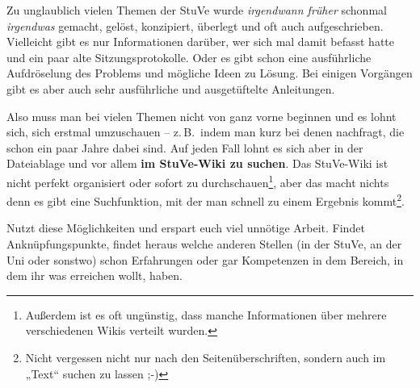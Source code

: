 


%
%
%


\null
\clearpage
\null
\vfill
Zu unglaublich vielen Themen der StuVe wurde \textit{irgendwann früher}{\textsuperscript\texttrademark} schonmal \textit{irgendwas}{\textsuperscript\textcopyright} gemacht, gelöst, konzipiert, überlegt und oft auch aufgeschrieben. Vielleicht gibt es nur Informationen darüber, wer sich mal damit befasst hatte und ein paar alte Sitzungsprotokolle. Oder es gibt schon eine ausführliche Aufdröselung des Problems und mögliche Ideen zu Lösung. Bei einigen Vorgängen gibt es aber auch sehr ausführliche und ausgetüftelte Anleitungen.

Also muss man bei vielen Themen nicht von ganz vorne beginnen und es lohnt sich, sich erstmal umzuschauen -- z.\,B.~indem man kurz bei denen nachfragt, die schon ein paar Jahre dabei sind. Auf jeden Fall lohnt es sich aber in der Dateiablage und vor allem \textbf{im StuVe-Wiki zu suchen}. Das StuVe-Wiki ist nicht perfekt organisiert oder sofort zu durchschauen\footnote{Außerdem ist es oft ungünstig, dass  manche Informationen über mehrere verschiedenen Wikis verteilt wurden.}, aber das macht nichts denn es gibt eine Suchfunktion, mit der man schnell zu einem Ergebnis kommt\footnote{Nicht vergessen nicht nur nach den Seitenüberschriften, sondern auch im „Text“ suchen zu lassen ;-)}.

Nutzt diese Möglichkeiten und erspart euch viel unnötige Arbeit. Findet Anknüpfungspunkte, findet heraus welche anderen Stellen (in der StuVe, an der Uni oder sonstwo) schon Erfahrungen oder gar Kompetenzen in dem Bereich, in dem ihr was erreichen wollt, haben.
\vfill
\vfill
